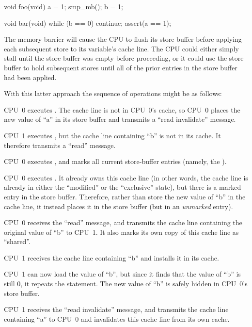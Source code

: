 \begin{VerbatimN}[fontsize=\footnotesize,samepage=true]
void foo(void)
{
	a = 1;
	smp_mb();
	b = 1;
}

void bar(void)
{
	while (b == 0) continue;
	assert(a == 1);
}
\end{VerbatimN}

The memory barrier  will cause the CPU to flush its store
buffer before applying each subsequent store to its variable's cache line.
The CPU could either simply stall until the store buffer was empty
before proceeding, or it could use the store buffer to hold subsequent
stores until all of the prior entries in the store buffer had been
applied.

With this latter approach the sequence of operations might be as follows:
\begin{sequence}
\item	CPU~0 executes .
	The cache line is not in CPU~0's cache, so CPU~0 places the new
	value of ``a'' in its store buffer and transmits a ``read
	invalidate'' message.
\item	CPU~1 executes , but the cache line
	containing ``b'' is not in its cache.
	It therefore transmits a ``read'' message.
\item	CPU~0 executes , and marks all current store-buffer
	entries (namely, the ).
\item	CPU~0 executes .
	It already owns this cache line (in other words, the cache line
	is already in either the ``modified'' or the ``exclusive'' state),
	but there is a marked entry in the store buffer.
	Therefore, rather than store the new value of ``b'' in the
	cache line, it instead places it in the store buffer (but
	in an \emph{unmarked} entry).
\item	CPU~0 receives the ``read'' message, and transmits the
	cache line containing the original value of ``b''
	to CPU~1.
	It also marks its own copy of this cache line as ``shared''.
\item	CPU~1 receives the cache line containing ``b'' and installs
	it in its cache.
\item	CPU~1 can now load the value of ``b'',
	but since it finds that the value of ``b'' is still 0, it repeats
	the  statement.
	The new value of ``b'' is safely hidden in CPU~0's store buffer.
\item	CPU~1 receives the ``read invalidate'' message, and
	transmits the cache line containing ``a'' to CPU~0 and
	invalidates this cache line from its own cache.

\end{sequence}

